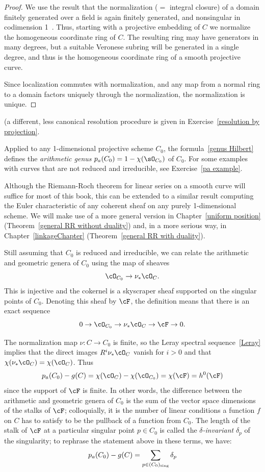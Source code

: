\begin{proof}
  We use the result that the normalization ($=$ integral closure) of a domain
finitely generated over a field is again finitely generated, and nonsingular in codimension 1~\cite[Theorem 4.14 and 11.5]{Eisenbud1995}. Thus,
starting with a projective embedding of $C$ we normalize the homogeneous coordinate ring of $C$. The resulting ring
may have generators in many degrees, but a suitable Veronese subring will be generated in a single degree, and thus
is the homogeneous coordinate ring of a smooth projective curve. 

Since localization
commutes with normalization, and any map from a normal ring to a domain factors uniquely through the normalization,
the normalization is unique.
\end{proof}

 (a different, less canonical resolution procedure
is given in Exercise~\ref{resolution by projection}.

Applied to any 1-dimensional projective scheme $C_0$, the formula~\ref{genus Hilbert} defines
the \emph{arithmetic genus} $p_a(C_0) = 1-\chi(\sO_{C_0})$ of $C_0$. For some examples with curves that are not
reduced and irreducible, see Exercise~\ref{pa example}.
 
 Although the Riemann-Roch theorem for linear series on a smooth curve will suffice for most of this book, this can
 be extended to a similar result computing the Euler characteristic of any coherent sheaf on any purely 1-dimensional
 scheme. We will make
 use of a more general version in Chapter~\ref{uniform position} (Theorem~\ref{general RR without duality})
  and, in a more serious way, in Chapter~\ref{linkageChapter} (Theorem~\ref{general RR with duality}). 
 
Still assuming that $C_0$ is reduced and irreducible, we can relate the arithmetic and geometric genera of $C_0$ using the map of sheaves
$$
\cO_{C_0} \to \nu_*\cO_C.
$$
This is injective and the cokernel is a skyscraper sheaf supported on the singular points of $C_0$. Denoting this sheaf by $\cF$, 
the definition means that there is an exact sequence
$$
0 \to \cO_{C_0} \to \nu_*\cO_C \to \cF \to 0.
$$

The normalization map $\nu: C \to C_0$ is finite, so the Leray spectral sequence~\ref{Leray} implies that the direct images $R^i\nu_*\cO_C$ vanish for $i > 0$ and that $\chi(\nu_*\cO_C) = \chi(\cO_C)$. Thus
$$
p_a(C_0) - g(C) =  \chi(\cO_{C}) -   \chi(\cO_{C_0}) = \chi(\cF) = h^0(\cF) 
$$ 
since the support of $\cF$ is finite.
In other words, the difference between the arithmetic and geometric genera of $C_0$ is the sum of the vector space dimensions of the stalks of $\cF$; colloquially, it is the number of linear conditions a function $f$ on $C$ has to satisfy to be the pullback of a function from $C_0$. The length of the stalk of $\cF$ at a particular singular point $p \in C_0$ is called the \emph{$\delta$-invariant} $\delta_p$ of the singularity; to rephrase the statement above in these terms, we have:
$$
p_a(C_0) - g(C) = \sum_{p \in (C_0)_{\rm sing}} \delta_p
$$ 


